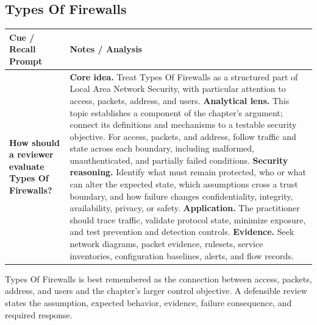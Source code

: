 \documentclass[11pt]{article}
\newcommand{\CornellHeader}{%
\rowcolor{Navy}\color{white}\bfseries Cue / Recall Prompt & \color{white}\bfseries Notes / Analysis\\\hline}
\newcommand{\CornellRow}[2]{%
\cellcolor{CueGray}\RaggedRight\textbf{#1} & \RaggedRight #2\\\hline}
\begin{document}
\subsection*{Types Of Firewalls}
\begin{longtable}{>{\RaggedRight\arraybackslash}p{}|>{\RaggedRight\arraybackslash}p{}}
\CornellHeader
\CornellRow{How should a reviewer evaluate Types Of Firewalls?}{\textbf{Core idea.} Treat Types Of Firewalls as a structured part of Local Area Network Security, with particular attention to access, packets, address, and users. \textbf{Analytical lens.} This topic establishes a component of the chapter's argument; connect its definitions and mechanisms to a testable security objective. For access, packets, and address, follow traffic and state across each boundary, including malformed, unauthenticated, and partially failed conditions. \textbf{Security reasoning.} Identify what must remain protected, who or what can alter the expected state, which assumptions cross a trust boundary, and how failure changes confidentiality, integrity, availability, privacy, or safety. \textbf{Application.} The practitioner should trace traffic, validate protocol state, minimize exposure, and test prevention and detection controls. \textbf{Evidence.} Seek network diagrams, packet evidence, rulesets, service inventories, configuration baselines, alerts, and flow records.}
\end{longtable}
\begin{topicsummary}
Types Of Firewalls is best remembered as the connection between access, packets, address, and users and the chapter's larger control objective. A defensible review states the assumption, expected behavior, evidence, failure consequence, and required response.
\end{topicsummary}
\end{document}
